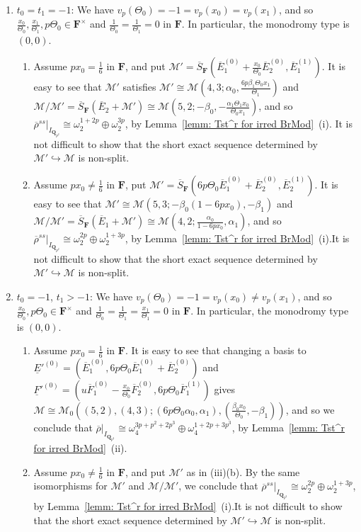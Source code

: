 \documentclass[11pt]{amsart}
\theoremstyle{definition}
\numberwithin{equation}{subsection}
\theoremstyle{plain}
\theoremstyle{plain}
\theoremstyle{plain}
\theoremstyle{plain}
\theoremstyle{plain}
\theoremstyle{plain}
\theoremstyle{plain}
\theoremstyle{plain}
\theoremstyle{plain}
\theoremstyle{plain}
\theoremstyle{plain}
\theoremstyle{plain}
\theoremstyle{definition}
\theoremstyle{definition}
\theoremstyle{definition}
\theoremstyle{remark}
\renewcommand{\(}{\textup{(}}
\renewcommand{\)}{\textup{)}}
\newcommand{\Q}{\mathbf{Q}}
\newcommand{\F}{\mathbf{F}}
\newcommand{\barS}{\overline{S}}
\newcommand{\rhobar}{\overline{\rho}}
\newcommand{\cM}{\mathcal{M}}
\newcommand{\barE}{\overline{E}}
\newcommand{\barF}{\overline{F}}
\newcommand{\IQptwo}{{I_{\Q_{p^2}}}}
\newcommand{\baseE}{\underline{E}}
\newcommand{\baseF}{\underline{F}}
\begin{document}
\begin{enumerate}[leftmargin=*]
  \item $t_0=t_1=-1$: We have $v_p(\Theta_0)=-1=v_p(x_0)=v_p(x_1)$, and so $\frac{x_0}{\Theta_0},\frac{x_1}{\Theta_1},p\Theta_0\in\F^\times$ and $\frac{1}{\Theta_0}=\frac{1}{\Theta_1}=0$ in $\F$. In particular, the monodromy type is $(0,0)$.
      \begin{enumerate}[leftmargin=*]
        \item Assume $px_0=\frac{1}{6}$ in $\F$, and put $\cM'=\barS_{\F}(\barE_1^{(0)}+\frac{x_0}{\Theta_0}\barE_2^{(0)},\barE_1^{(1)})$. It is easy to see that $\cM'$ satisfies $\cM'\cong\cM(4,3;\alpha_0,\frac{6p\beta_1\Theta_0x_1}{\Theta_1})$ and $\cM/\cM'=\barS_{\F}(\barE_2+\cM') \cong\cM(5,2;-\beta_0,-\frac{\alpha_1\Theta_1x_0}{\Theta_0x_1})$, and so $\rhobar^{ss}|_\IQptwo\cong\omega_2^{1+2p}\oplus\omega_2^{3p}$, by Lemma~\ref{lemm: Tst^r for irred BrMod}~(i). It is not difficult to show that the short exact sequence determined by $\cM'\hookrightarrow \cM$ is non-split.
        \item Assume $px_0\neq\frac{1}{6}$ in $\F$, put $\cM'=\barS_{\F}(6p\Theta_0\barE_1^{(0)}+\barE_2^{(0)},\barE_2^{(1)})$. It is easy to see that $\cM'\cong\cM(5,3;-\beta_0(1-6px_0),-\beta_1)$ and $\cM/\cM'=\barS_{\F}(\barE_1+\cM')\cong\cM(4,2;\frac{\alpha_0}{1-6px_0},\alpha_1)$, and so $\rhobar^{ss}|_\IQptwo\cong\omega_2^{2p}\oplus\omega_2^{1+3p}$, by Lemma~\ref{lemm: Tst^r for irred BrMod}~(i).It is not difficult to show that the short exact sequence determined by $\cM'\hookrightarrow \cM$ is non-split.
      \end{enumerate}
  \item $t_0=-1$, $t_1>-1$: We have $v_p(\Theta_0)=-1=v_p(x_0)\neq v_p(x_1)$, and so $\frac{x_0}{\Theta_0},p\Theta_0\in\F^\times$ and $\frac{1}{\Theta_0}=\frac{1}{\Theta_1}=\frac{x_1}{\Theta_1}=0$ in $\F$. In particular, the monodromy type is $(0,0)$.
      \begin{enumerate}[leftmargin=*]
        \item Assume $px_0=\frac{1}{6}$ in $\F$. It is easy to see that changing a basis to $\baseE'^{(0)}=(\barE_1^{(0)}, 6p\Theta_0\barE_1^{(0)}+\barE_2^{(0)})$ and $\baseF'^{(0)}=(u\barF_1^{(0)}-\frac{x_0}{\Theta_0}\barF_2^{(0)},6p\Theta_0\barF_1^{(1)})$ gives $\cM\cong\cM_0((5,2),(4,3); (6p\Theta_0\alpha_0,\alpha_1),(\frac{\beta_0x_0}{\Theta_0},-\beta_1))$, and so we conclude that $\rhobar|_\IQptwo \cong\omega_4^{3p+p^2+2p^3}\oplus\omega_4^{1+2p+3p^3}$, by Lemma~\ref{lemm: Tst^r for irred BrMod}~(ii).
        \item Assume $px_0\neq\frac{1}{6}$ in $\F$, and put $\cM'$ as in (iii)(b). By the same isomorphisms for $\cM'$ and $\cM/\cM'$, we conclude that $\rhobar^{ss}|_\IQptwo\cong\omega_2^{2p}\oplus\omega_2^{1+3p}$, by Lemma~\ref{lemm: Tst^r for irred BrMod}~(i).It is not difficult to show that the short exact sequence determined by $\cM'\hookrightarrow \cM$ is non-split.
      \end{enumerate}
\end{enumerate}
\end{document}
